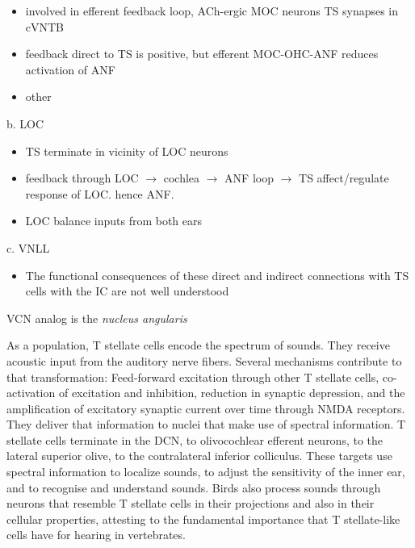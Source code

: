 \begin{itemize}
\item involved in efferent feedback loop, ACh-ergic MOC neurons TS synapses in cVNTB \citep{WarrBeck:1996,Warr:1992,Warr:1982,VeneciaLibermanEtAl:2005,ThompsonThompson:1991,SmithJorisEtAl:1993}
\item feedback direct to TS is positive, but efferent MOC-OHC-ANF reduces activation of ANF \citep{WarrenLiberman:1989,WiederholdKiang:1970}
\item other \citep{RobertsonMulders:2000,WinterRobertsonEtAl:1989}
\end{itemize}
b. LOC

\begin{itemize}
\item TS terminate in vicinity of LOC neurons \citep{Warr:1982,ThompsonThompson:1988,ThompsonThompson:1991,DoucetRyugo:2003}
\item feedback through LOC $\rightarrow$ cochlea $\rightarrow$ ANF loop $\rightarrow$ TS affect/regulate response of LOC. hence ANF.
\item LOC balance inputs from both ears \citep{DarrowMaisonEtAl:2006}
\end{itemize}

c. VNLL

\begin{itemize}
\item The functional consequences of these direct and indirect connections with TS cells with the IC are not well understood
\end{itemize}
\label{sec-1_7}


VCN analog is the \emph{nucleus angularis}
\label{sec-1_8}


As a population, T stellate cells encode the spectrum of sounds. They
receive acoustic input from the auditory nerve fibers. Several
mechanisms contribute to that transformation: Feed-forward excitation
through other T stellate cells, co-activation of excitation and
inhibition, reduction in synaptic depression, and the amplification of
excitatory synaptic current over time through NMDA receptors. They
deliver that information to nuclei that make use of spectral
information.  T stellate cells terminate in the DCN, to olivocochlear
efferent neurons, to the lateral superior olive, to the contralateral
inferior colliculus. These targets use spectral information to
localize sounds, to adjust the sensitivity of the inner ear, and to
recognise and understand sounds. Birds also process sounds through
neurons that resemble T stellate cells in their projections and also
in their cellular properties, attesting to the fundamental importance
that T stellate-like cells have for hearing in vertebrates.










